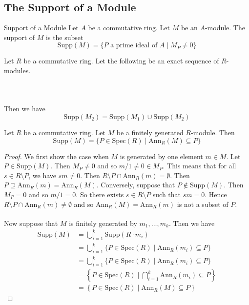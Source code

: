 \documentclass[a4paper]{article}
\begin{document}
\subsection{The Support of a Module}
\begin{defn}{Support of a Module}{} Let $A$ be a commutative ring. Let $M$ be an $A$-module. The support of $M$ is the subset $$\text{Supp}(M)=\{P\text{ a prime ideal of }A\;|\;M_P\neq 0\}$$
\end{defn}

\begin{lmm}{}{} Let $R$ be a commutative ring. Let the following be an exact sequence of $R$-modules. \\~\\
\\~\\
Then we have $$\text{Supp}(M_2)=\text{Supp}(M_1)\cup\text{Supp}(M_2)$$
\end{lmm}

\begin{prp}{}{} Let $R$ be a commutative ring. Let $M$ be a finitely generated $R$-module. Then $$\text{Supp}(M)=\{P\in\text{Spec}(R)\;|\;\text{Ann}_R(M)\subseteq P\}$$ 
\begin{proof}
We first show the case when $M$ is generated by one element $m\in M$. Let $P\in\text{Supp}(M)$. Then $M_P\neq 0$ and so $m/1\neq 0\in M_P$. This means that for all $s\in R\setminus P$, we have $sm\neq 0$. Then $R\setminus P\cap\text{Ann}_R(m)=\emptyset$. Then $P\supseteq\text{Ann}_R(m)=\text{Ann}_R(M)$. Conversely, suppose that $P\notin\text{Supp}(M)$. Then $M_P=0$ and so $m/1=0$. So there exists $s\in R\setminus P$ such that $sm=0$. Hence $R\setminus P\cap\text{Ann}_R(m)\neq\emptyset$ and so $\text{Ann}_R(M)=\text{Ann}_R(m)$ is not a subset of $P$. \\~\\

Now suppose that $M$ is finitely generated by $m_1,\dots,m_k$. Then we have 
\begin{align*}
\text{Supp}(M)&=\bigcup_{i=1}^k\text{Supp}(R\cdot m_i)\\
&=\bigcup_{i=1}^k\{P\in\text{Spec}(R)\;|\;\text{Ann}_R(m_i)\subseteq P\}\\
&=\bigcup_{i=1}^k\{P\in\text{Spec}(R)\;|\;\text{Ann}_R(m_i)\subseteq P\}\\
&=\left\{P\in\text{Spec}(R)\;|\;\bigcap_{i=1}^k\text{Ann}_R(m_i)\subseteq P\right\}\tag{lmm1.1.2}\\
&=\left\{P\in\text{Spec}(R)\;|\;\text{Ann}_R(M)\subseteq P\right\}
\end{align*}
\end{proof}
\end{prp}
\end{document}
